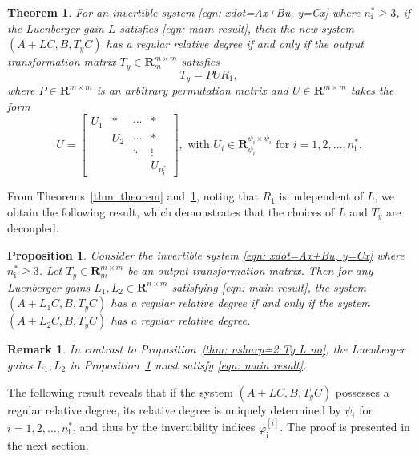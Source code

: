\documentclass[sort&compress]{elsarticle}
\newtheorem{remark}{Remark}
\newtheorem{theorem}{Theorem}
\newtheorem{prop}{Proposition}
\newcommand\faii{\varphi_\mathrm i}
\newcommand\nsharp{n_\mathrm i^*}
\newcommand\R{\mathbf R}
\begin{document}
\begin{theorem}\label{thm: theorem solve Ty}
For an invertible system \eqref{eqn: xdot=Ax+Bu, y=Cx} where $\nsharp \ge 3$,
if the Luenberger gain $L$ satisfies \eqref{eqn: main result},
then the new system $(A+LC, B, T_yC)$
has a regular relative degree if and only if
the output transformation matrix $T_y \in \R^{m \times m}_m$ satisfies
\begin{equation}\label{eqn: Ty=PUR1}
T_y = PUR_1,
\end{equation}
where $P \in \R^{m \times m}$ is an arbitrary permutation matrix
and $U \in \R^{m \times m}$ takes the form
\begin{equation*}
U = \begin{bmatrix}
U_1 & * & \cdots & * \\
& U_2 & \cdots & * \\
& & \ddots & \vdots \\
& & & U_{\nsharp}
\end{bmatrix},
\text{ with $U_i \in \R^{\psi_i \times \psi_i}_{\psi_i}$ for $i=1,2,\dots,\nsharp$.}
\end{equation*}
\end{theorem}

From Theorems~\ref{thm: theorem} and~\ref{thm: theorem solve Ty},
noting that $R_1$ is independent of $L$,
we obtain the following result, which demonstrates that
the choices of $L$ and $T_y$ are decoupled.

\begin{prop}\label{thm: nsharp=3 Ty L no}
Consider the invertible system \eqref{eqn: xdot=Ax+Bu, y=Cx}
where $\nsharp \ge 3$.
Let $T_y \in \R^{m \times m}_m$ be an output transformation matrix.
Then for any Luenberger gains $L_1, L_2 \in \R^{n \times m}$
satisfying \eqref{eqn: main result},
the system $(A+L_1C, B, T_yC)$ has a regular relative degree
if and only if
the system $(A+L_2C, B, T_yC)$ has a regular relative degree.
\end{prop}

\begin{remark}
In contrast to Proposition~\ref{thm: nsharp=2 Ty L no},
the Luenberger gains $L_1, L_2$
in Proposition~\ref{thm: nsharp=3 Ty L no} must satisfy \eqref{eqn: main result}.
\end{remark}

The following result reveals that if the system $(A+LC, B, T_yC)$
possesses a regular relative degree, its relative degree is
uniquely determined by $\psi_i$ for $i=1,2,\dots,\nsharp$,
and thus by the invertibility indices $\faii^{[i]}$.
The proof is presented in the next section.
\end{document}
